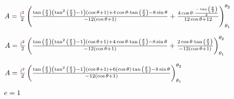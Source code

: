 \begin{flushleft}
$A=\frac{\textcolor{purple}{l}^2}{2}\left(
\frac{\tan{\left(\frac{\theta}{2}\right)}\left(\tan^2{\left(\frac{\theta}{2}\right)}-1\right)(\cos{\theta}+1)
+4\cos{\theta}\cdot\tan{\left(\frac{\theta}{2}\right)}
-8\sin{\theta}}
{-12(\cos{\theta}+1)}
+\frac
{4\cos{\theta}\cdot\frac{-\tan{\left(\frac{\theta}{2}\right)}}{2}}
{12\cos{\theta}+12}
\right)_{\theta_1}^{\theta_2}$

$A=\frac{\textcolor{purple}{l}^2}{2}\left(
\frac{\tan{\left(\frac{\theta}{2}\right)}\left(\tan^2{\left(\frac{\theta}{2}\right)}-1\right)(\cos{\theta}+1)
+4\cos{\theta}\cdot\tan{\left(\frac{\theta}{2}\right)}
-8\sin{\theta}}
{-12(\cos{\theta}+1)}
+\frac
{2\cos{\theta}\cdot\tan{\left(\frac{\theta}{2}\right)}}
{-12(\cos{\theta}+1)}
\right)_{\theta_1}^{\theta_2}$

$A=\frac{\textcolor{purple}{l}^2}{2}\left(
\frac{\tan{\left(\frac{\theta}{2}\right)}\left(\tan^2{\left(\frac{\theta}{2}\right)}-1\right)(\cos{\theta}+1)
+6(\cos{\theta})\tan{\left(\frac{\theta}{2}\right)}
-8\sin{\theta}}
{-12(\cos{\theta}+1)}
\right)_{\theta_1}^{\theta_2}$

\end{flushleft}

\normalsize

$\textcolor{black}{e}=1$
